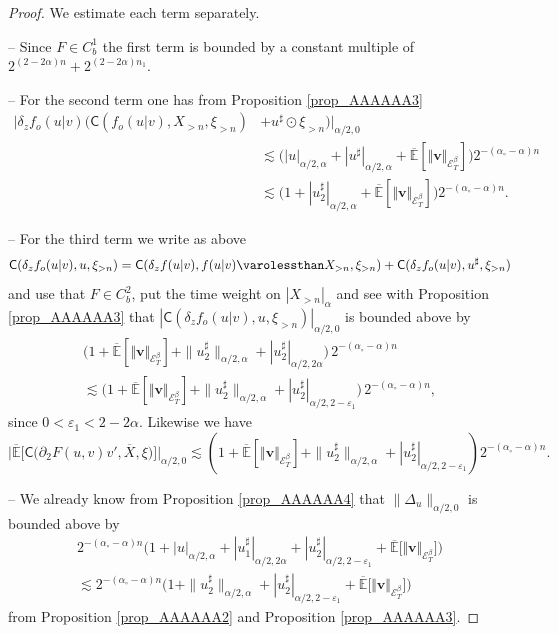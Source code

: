 \documentclass[JEP,XML,SOM,Unicode,published]{cedram}
\theoremstyle{definition}
\let\epsilon\varepsilon
\newcommand\bbE{\mathbb{E}}
\newcommand{\mcE}{\mathcal{E}}
\newcommand{\bsv}{\boldsymbol{v}}
\newcommand{\norme}[1]{\Vert #1 \Vert}
\begin{document}
\begin{proof} We estimate each term separately.

-- Since $F \in C^1_b$ the first term is bounded by a constant multiple of $2^{(2 - 2 \alpha) n} + 2^{(2 - 2 \alpha) n_1}$.

-- For the second term one has from Proposition \ref{prop_AAAAAA3}
\begin{align*}
| \delta_z f_o (u\vert v) (\mathsf{C} (f_o (u\vert v), X_{> n}, \xi_{> n}) &+ u^{\sharp} \odot \xi_{>
n}) |_{\alpha / 2, 0} \\
&\lesssim \bigl(| u |_{\alpha / 2, \alpha} + |
u^{\sharp} |_{\alpha / 2, \alpha} + \overline{\bbE}[\norme{\bsv}_{\mcE^\beta_T}] \bigr) 2^{- (\alpha_{\circ} - \alpha) n}
\\
& \lesssim \bigl(1 + | u_2^{\sharp} |_{\alpha / 2, \alpha} + \overline{\bbE}[\norme{\bsv}_{\mcE^\beta_T}] \bigr) 2^{-
(\alpha_{\circ} - \alpha) n}.
\end{align*}

-- For the third term we write as above
\[
\mathsf{C} (\delta_z f_o(u\vert v), u, \xi_{> n}) = \mathsf{C} ( \delta_z f (u\vert v), f (u\vert v) \varolessthan X_{> n}, \xi_{> n}) + \mathsf{C} (\delta_z f_o (u\vert v), u^{\sharp}, \xi_{> n})
\]
and use that $F \in C^2_b$, put the time weight on $| X_{> n} |_{\alpha}$ and see with Proposition \ref{prop_AAAAAA3} that $| \mathsf{C} (\delta_zf_o(u\vert v), u, \xi_{> n}) |_{\alpha /
2, 0}$ is bounded above by
\begin{multline*}
\bigl(1 +\overline{\bbE}[\norme{\bsv}_{\mcE^\beta_T}] + \| u^{\sharp}_2 \|_{\alpha / 2, \alpha} + | u_2^{\sharp} |_{\alpha / 2, 2 \alpha}\bigr) \, 2^{- (\alpha_{\circ} - \alpha) n} \\
\lesssim \bigl(1 +\overline{\bbE}[\norme{\bsv}_{\mcE^\beta_T}]+ \| u^{\sharp}_2 \|_{\alpha / 2, \alpha} + | u_2^{\sharp} |_{\alpha / 2, 2 - \epsilon_1}\bigr) \, 2^{- (\alpha_{\circ} - \alpha) n},
\end{multline*}
since $0 < \epsilon_1 < 2 - 2 \alpha$. Likewise we have
\[
\big|\overline{\bbE}\bigl[\mathsf{C}\bigl(\partial_2 F(u,v)v', \overline{X},\xi\bigr)\bigr] \big|_{\alpha/2,0} \lesssim (1 +\overline{\bbE}[\norme{\bsv}_{\mcE^\beta_T}] + \| u^{\sharp}_2 \|_{\alpha / 2, \alpha} + | u_2^{\sharp} |_{\alpha / 2, 2 - \epsilon_1}) 2^{- (\alpha_{\circ} - \alpha) n}.
\]

-- We already know from Proposition \ref{prop_AAAAAA4} that $\| \Delta_u \|_{\alpha / 2, 0}$ is bounded above by
\begin{multline*}
2^{- (\alpha_{\circ} - \alpha) n} \bigl( 1 + | u |_{\alpha / 2, \alpha} +
| {u_1^{\sharp}} |_{\alpha / 2, 2 \alpha} + |
{u_2^{\sharp}} |_{\alpha / 2, 2 - \epsilon_1} +\overline{\bbE}\bigl[\norme{\bsv}_{\mcE^\beta_T}\bigr] \bigr)
\\
\lesssim
2^{-(\alpha_{\circ} - \alpha) n} \bigl(1 + \| u^{\sharp}_2 \|_{\alpha / 2, \alpha} +
| u_2^{\sharp} |_{\alpha / 2, 2 - \epsilon_1} +\overline{\bbE}\bigl[\norme{\bsv}_{\mcE^\beta_T}\bigr]\bigr)
\end{multline*}
from Proposition \ref{prop_AAAAAA2} and Proposition \ref{prop_AAAAAA3}.


\end{proof}
\end{document}
